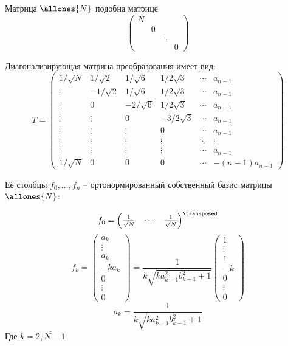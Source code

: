\begin{propose}
    Матрица \( \allones{N} \) подобна матрице
    \[\begin{pmatrix}
        N &   &        & \\
        & 0 &        & \\
        &   & \ddots & \\
        &   &        & 0
    \end{pmatrix}\]

    Диагонализирующая матрица преобразования имеет вид:
    \begin{equation}\label{eq:diagtransform}
    T =
    \begin{pmatrix}
        1/\sqrt N &  1/\sqrt2 & 1/\sqrt6  & 1/2\sqrt3  & \cdots & a_{n-1} \\
        \vdots    & -1/\sqrt2 & 1/\sqrt6  & 1/2\sqrt3  & \cdots & a_{n-1} \\
        \vdots    & 0         & -2/\sqrt6 & 1/2\sqrt3  & \cdots & a_{n-1} \\
        \vdots    & \vdots    & 0         & -3/2\sqrt3 & \cdots & a_{n-1} \\
        \vdots    & \vdots    & \vdots    & 0          & \cdots & a_{n-1} \\
        \vdots    & \vdots    & \vdots    & \vdots     & \ddots & \vdots  \\
        \vdots    & \vdots    & \vdots    & \vdots     & \cdots & a_{n-1} \\
        1/\sqrt N & 0         & 0         & 0          & \cdots & -(n-1)a_{n-1}
        \end{pmatrix}
        \end{equation}

    Её столбцы \( f_0, \ldots, f_n \) -- ортонормированный собственный базис матрицы \( \allones{N} \):

    \[f_0 = \begin{pmatrix} \frac{1}{\sqrt N} & \cdots & \frac{1}{\sqrt N} \end{pmatrix}^\transposed\]
    \providecommand{\fknorm}{\sqrt{k a_{k-1}^2 b_{k-1}^2 + 1}}
    \[
        f_k =
        \begin{pmatrix}a_k \\ \vdots \\ a_k \\ -ka_k \\ 0 \\ \vdots \\ 0 \end{pmatrix} =
        \frac{1}{k\fknorm}
        \begin{pmatrix}1 \\ \vdots \\ 1 \\ -k \\ 0 \\ \vdots \\ 0 \end{pmatrix}
        \]
    \[
         a_k = \frac{1}{k\fknorm}
         \]
         Где \( k=\overline{2,N-1} \)


\end{propose}
